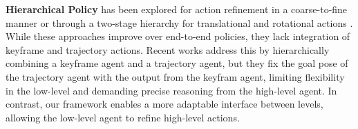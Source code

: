 

\textbf{Hierarchical Policy} has been explored for action refinement in a coarse-to-fine manner \cite{levy2018hierarchical, gualtieri2020learning, james2022coarse} or through a two-stage hierarchy for translational and rotational actions \cite{sharma2017learning, wang2020policy, rss22xupeng}. While these approaches improve over end-to-end policies, they lack integration of keyframe and trajectory actions. Recent works \cite{xian2023chaineddiffuser, ma2024hierarchical} address this by hierarchically combining a keyframe agent and a trajectory agent, but they fix the goal pose of the trajectory agent with the output from the keyfram agent, limiting  flexibility in the low-level and demanding precise reasoning from the high-level agent. In contrast, our framework enables a more adaptable interface between levels, allowing the low-level agent to refine high-level actions.


